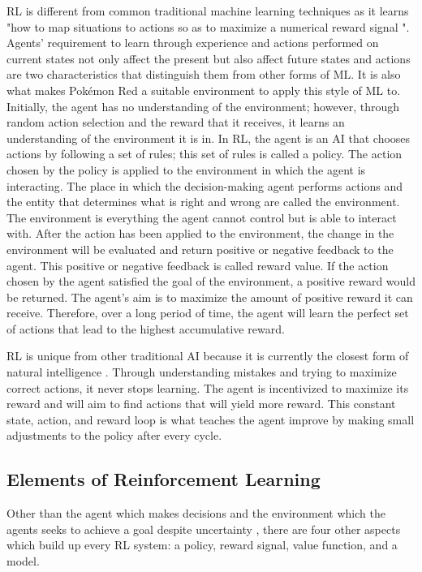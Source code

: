 RL is different from common traditional machine learning techniques as it learns "how to map situations to actions so as to maximize a numerical reward signal \cite{Sutton1}". Agents' requirement to learn through experience and actions performed on current states not only affect the present but also affect future states and actions are two characteristics that distinguish them from other forms of ML. It is also what makes Pokémon Red a suitable environment to apply this style of ML to. Initially, the agent has no understanding of the environment; however, through random action selection and the reward that it receives, it learns an understanding of the environment it is in. In RL, the agent is an AI that chooses actions by following a set of rules; this set of rules is called a policy. The action chosen by the policy is applied to the environment in which the agent is interacting. The place in which the decision-making agent performs actions and the entity that determines what is right and wrong are called the environment. The environment is everything the agent cannot control but is able to interact with. After the action has been applied to the environment, the change in the environment will be evaluated and return positive or negative feedback to the agent. This positive or negative feedback is called reward value. If the action chosen by the agent satisfied the goal of the environment, a positive reward would be returned. The agent’s aim is to maximize the amount of positive reward it can receive. Therefore, over a long period of time, the agent will learn the perfect set of actions that lead to the highest accumulative reward. 

RL is unique from other traditional AI because it is currently the closest form of natural intelligence \cite{Sutton1}. Through understanding mistakes and trying to maximize correct actions, it never stops learning. The agent is incentivized to maximize its reward and will aim to find actions that will yield more reward. This constant state, action, and reward loop is what teaches the agent improve by making small adjustments to the policy after every cycle. 

\subsection{Elements of Reinforcement Learning}

Other than the agent which makes decisions and the environment which the agents seeks to achieve a goal despite uncertainty \cite{Sutton1}, there are four other aspects which build up every RL system: a policy, reward signal, value function, and a model.

